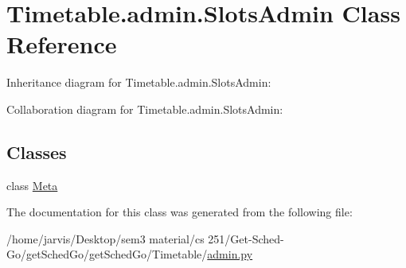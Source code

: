 \hypertarget{classTimetable_1_1admin_1_1SlotsAdmin}{}\section{Timetable.\+admin.\+Slots\+Admin Class Reference}
\label{classTimetable_1_1admin_1_1SlotsAdmin}


Inheritance diagram for Timetable.\+admin.\+Slots\+Admin\+:


Collaboration diagram for Timetable.\+admin.\+Slots\+Admin\+:
\subsection*{Classes}
\begin{DoxyCompactItemize}
\item 
class \hyperlink{classTimetable_1_1admin_1_1SlotsAdmin_1_1Meta}{Meta}
\end{DoxyCompactItemize}


The documentation for this class was generated from the following file\+:\begin{DoxyCompactItemize}
\item 
/home/jarvis/\+Desktop/sem3 material/cs 251/\+Get-\/\+Sched-\/\+Go/get\+Sched\+Go/get\+Sched\+Go/\+Timetable/\hyperlink{Timetable_2admin_8py}{admin.\+py}\end{DoxyCompactItemize}
